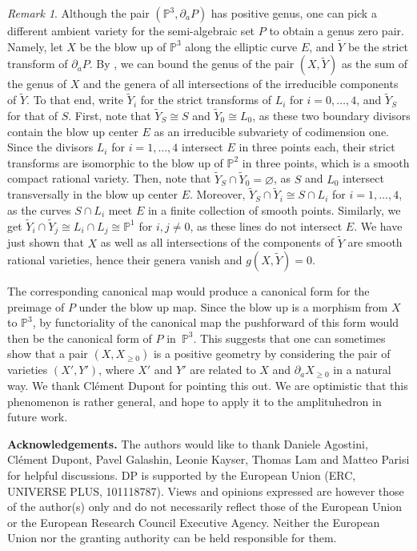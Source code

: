 \documentclass[12pt]{extarticle}
\theoremstyle{definition}
\theoremstyle{theorem}
\theoremstyle{remark}
\newtheorem{remark}[definition]{Remark}
\numberwithin{equation}{section}
\newcommand{\PP}{\mathbb{P}}
\begin{document}
\begin{remark} \label{rem:final}
Although the pair $(\mathbb{P}^3, \partial_a P)$ has positive genus, one can pick a different ambient variety for the semi-algebraic set $P$ to obtain a genus zero pair. Namely, let $X$ be the blow up of $\mathbb{P}^3$ along the elliptic curve $E$, and $\widetilde Y$ be the strict transform of $\partial_a P$. 
By \cite[Corollary 3.14]{brown-dupont}, we can bound the genus of the pair $(X,\widetilde Y)$ as the sum of the genus of $X$ and the genera of all intersections of the irreducible components of $\widetilde Y$.
To that end, write $\widetilde Y_i$ for the strict transforms of $L_i$ for $i=0,\ldots,4$, and $\widetilde Y_S$ for that of $S$. First, note that $\widetilde{Y}_S \cong S$ and $\widetilde{Y}_0 \cong L_0$, as these two boundary divisors contain the blow up center $E$ as an irreducible subvariety of codimension one. 
Since the divisors $L_i$ for $i=1,\ldots, 4$ intersect $E$ in three points each, their strict transforms are isomorphic to the blow up of $\mathbb{P}^2$ in three points, which is a smooth compact rational variety. 
Then, note that $\widetilde Y_S\cap \widetilde Y_0=\varnothing$, as $S$ and $L_0$ intersect transversally in the blow up center $E$.
Moreover, $\widetilde Y_S\cap \widetilde Y_i\cong S\cap L_i$ for $i=1,\ldots,4$, as the curves $S\cap L_i$ meet $E$ in a finite collection of smooth points.
Similarly, we get $\widetilde Y_i\cap \widetilde Y_j\cong L_i\cap L_j\cong \PP^1$ for $i,j\neq 0$, as these lines do not intersect $E$.
We have just shown that $X$ as well as all intersections of the components of $\widetilde Y$ are smooth rational varieties, hence their genera vanish and $g(X,\widetilde Y)=0$.

The corresponding canonical map would produce a canonical form for the preimage of $P$ under the blow up map. Since the blow up is a morphism from $X$ to $\mathbb{P}^3$, by functoriality of the canonical map the pushforward of this form would then be the canonical form of $P$ in~$\mathbb{P}^3$. 
This suggests that one can sometimes show that a pair $(X, X_{\geq 0})$ is a positive geometry by considering the pair of varieties $(X', Y')$, where $X'$ and $Y'$ are related to $X$ and $\partial_a X_{\geq 0}$ in a natural way. We thank Cl\'ement Dupont for pointing this out. We are optimistic that this phenomenon is rather general, and hope to apply it to the amplituhedron in future work.   
\end{remark}


\bigskip
\noindent\textbf{Acknowledgements.} The authors would like to thank Daniele Agostini, Cl\'ement Dupont, Pavel Galashin, Leonie Kayser, Thomas Lam and Matteo Parisi for helpful discussions. DP is supported by the European Union (ERC, UNIVERSE PLUS, 101118787). Views and opinions expressed are however those of the author(s) only and do not necessarily reflect those of the European Union or the European Research Council Executive Agency. Neither the European Union nor the granting authority can be held responsible for them.
\end{document}
